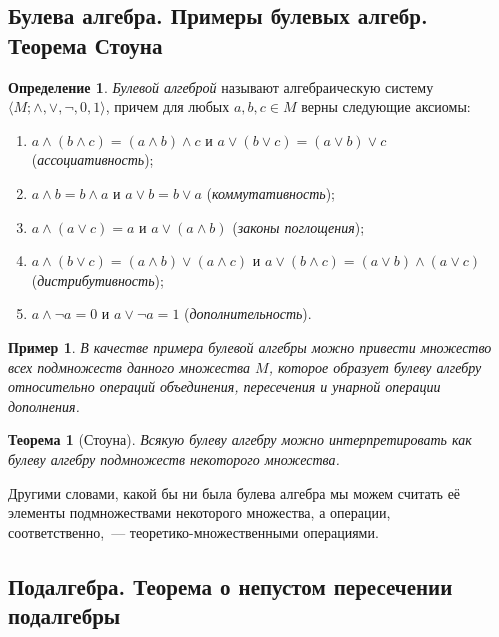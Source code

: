 \documentclass{article}
\newtheorem*{theorem*}{Теорема}
\theoremstyle{plain}
\newtheorem*{example*}{Пример}
\theoremstyle{definition}
\newtheorem{definition}{Определение}[subsection]
\begin{document}
\subsection{Булева алгебра. Примеры булевых алгебр. Теорема Стоуна}

\begin{definition}
	\textit{Булевой алгеброй} называют алгебраическую систему \(\langle M; \land, \lor, \lnot, 0, 1\rangle\), причем для любых \(a, b, c \in M\) верны следующие аксиомы:

	\begin{enumerate}[label=\roman*.]
		\item \(a \land (b \land c) = (a \land b) \land c\) и \(a \lor (b \lor c) = (a \lor b) \lor c\) (\textit{ассоциативность});
		\item \(a \land b = b \land a\) и \(a \lor b = b \lor a\) (\textit{коммутативность});
		\item \(a \land (a \lor c) = a\) и \(a \lor (a \land b)\) (\textit{законы поглощения});
		\item \(a \land (b \lor c) = (a \land b) \lor (a \land c)\) и \(a \lor (b \land c) = (a \lor b) \land (a \lor c)\) (\textit{дистрибутивность});
		\item \(a \land \lnot a = 0\) и \(a \lor \lnot a = 1\) (\textit{дополнительность}).
	\end{enumerate}
\end{definition}

\begin{example*}
	В качестве примера булевой алгебры можно привести множество всех подмножеств данного множества \(M\), которое образует булеву алгебру относительно операций объединения, пересечения и унарной операции дополнения.
\end{example*}

\begin{theorem*}[Стоуна]
	Всякую булеву алгебру можно интерпретировать как булеву алгебру подмножеств некоторого множества.
\end{theorem*}

Другими словами, какой бы ни была булева алгебра мы можем считать её элементы подмножествами некоторого множества, а операции, соответственно,~--- теоретико-множественными операциями.

\subsection{Подалгебра. Теорема о непустом пересечении подалгебры}
\end{document}
